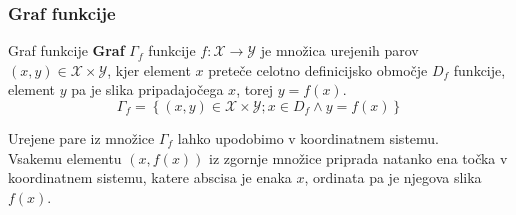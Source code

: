         \begin{frame}
            \frametitle{Graf funkcije}

            \begin{alertblock}{Graf funkcije}
                \textbf{Graf} $\Gamma_f$ funkcije $f:\mathcal{X}\to\mathcal{Y}$ je množica urejenih parov $(x,y)\in\mathcal{X}\times\mathcal{Y}$, 
                kjer element $x$ preteče celotno definicijsko območje $D_f$ funkcije, element $y$ pa je slika pripadajočega $x$, torej $y=f(x)$.
                $$ \Gamma_f=\left\{(x,y)\in\mathcal{X}\times\mathcal{Y}; x\in D_f \land y=f(x)\right\} $$
            \end{alertblock}

            \begin{block}{}
                Urejene pare iz množice $\Gamma_f$ lahko upodobimo v koordinatnem sistemu. \\
                Vsakemu elementu $(x,f(x))$ iz zgornje množice priprada natanko ena točka v koordinatnem sistemu, 
                katere abscisa je enaka $x$, ordinata pa je njegova slika $f(x)$.
            \end{block}
        \end{frame}


        \begin{frame}
        \end{frame}

